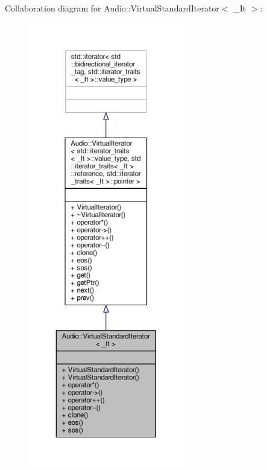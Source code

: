 Collaboration diagram for Audio\+:\+:Virtual\+Standard\+Iterator$<$ \+\_\+\+It $>$\+:
\nopagebreak
\begin{figure}[H]
\begin{center}
\leavevmode
\includegraphics[height=550pt]{d2/db5/classAudio_1_1VirtualStandardIterator__coll__graph}
\end{center}
\end{figure}
